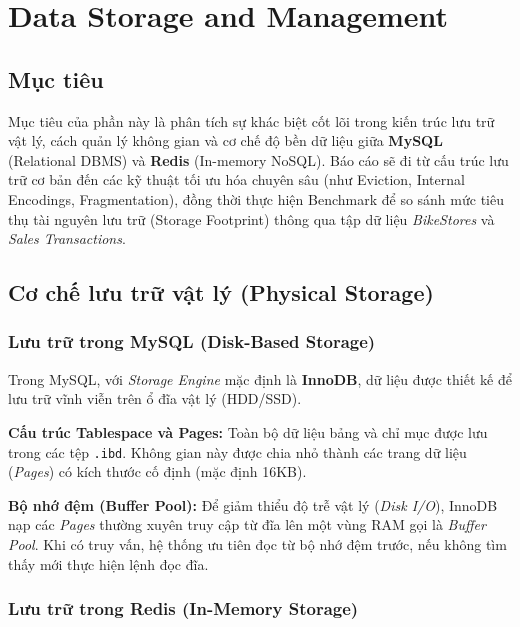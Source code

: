 ﻿\section{Data Storage and Management}

\subsection{Mục tiêu}
Mục tiêu của phần này là phân tích sự khác biệt cốt lõi trong kiến trúc lưu trữ vật lý, cách quản lý không gian và cơ chế độ bền dữ liệu giữa \textbf{MySQL} (Relational DBMS) và \textbf{Redis} (In-memory NoSQL). Báo cáo sẽ đi từ cấu trúc lưu trữ cơ bản đến các kỹ thuật tối ưu hóa chuyên sâu (như Eviction, Internal Encodings, Fragmentation), đồng thời thực hiện Benchmark để so sánh mức tiêu thụ tài nguyên lưu trữ (Storage Footprint) thông qua tập dữ liệu \textit{BikeStores} và \textit{Sales Transactions}.

\subsection{Cơ chế lưu trữ vật lý (Physical Storage)}

\subsubsection{Lưu trữ trong MySQL (Disk-Based Storage)}

Trong MySQL, với \textit{Storage Engine} mặc định là \textbf{InnoDB}, dữ liệu được thiết kế để lưu trữ vĩnh viễn trên ổ đĩa vật lý (HDD/SSD).

\vspace{1em}

\noindent\textbf{Cấu trúc Tablespace và Pages:} 
Toàn bộ dữ liệu bảng và chỉ mục được lưu trong các tệp \texttt{.ibd}. Không gian này được chia nhỏ thành các trang dữ liệu (\textit{Pages}) có kích thước cố định (mặc định 16KB). 

\vspace{0.5em}

\noindent\textbf{Bộ nhớ đệm (Buffer Pool):} 
Để giảm thiểu độ trễ vật lý (\textit{Disk I/O}), InnoDB nạp các \textit{Pages} thường xuyên truy cập từ đĩa lên một vùng RAM gọi là \textit{Buffer Pool}. Khi có truy vấn, hệ thống ưu tiên đọc từ bộ nhớ đệm trước, nếu không tìm thấy mới thực hiện lệnh đọc đĩa.

\subsubsection{Lưu trữ trong Redis (In-Memory Storage)}

